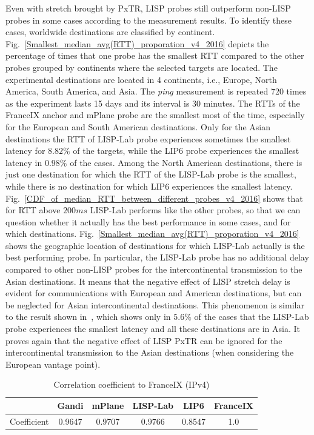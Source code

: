 Even with stretch brought by PxTR, LISP probes still outperform non-LISP probes in some cases according to the measurement results. To identify these cases, worldwide destinations are classified by continent.
Fig.~\ref{Smallest_median_avg(RTT)_proporation_v4_2016} depicts the percentage of times that one probe has the smallest RTT compared to the other probes grouped by continents where the selected targets are located.
The experimental destinations are located in 4 continents, i.e., Europe, North America, South America, and Asia. The \emph{ping} measurement is repeated 720 times as the experiment lasts 15 days and its interval is 30 minutes. The RTTs of the FranceIX anchor and mPlane probe are the smallest most of the time, especially for the European and South American destinations. Only for the Asian destinations the RTT of LISP-Lab probe experiences sometimes the smallest latency for $8.82\%$ of the targets, while the LIP6 probe experiences the smallest latency in $0.98\%$ of the cases. Among the North American destinations, there is just one destination for which the RTT of the LISP-Lab probe is the smallest, while there is no destination for which LIP6 experiences the smallest latency. Fig.~\ref{CDF_of_median_RTT_between_different_probes_v4_2016} shows that for RTT above $200ms$ LISP-Lab performs like the other probes, so that we can question whether it actually has the best performance in some cases, and for which destinations. Fig.~\ref{Smallest_median_avg(RTT)_proporation_v4_2016} shows the geographic location of destinations for which LISP-Lab actually is the best performing probe. In particular, the LISP-Lab probe has no additional delay compared to other non-LISP probes for the intercontinental transmission to the Asian destinations. It means that the negative effect of LISP stretch delay is evident for communications with European and American destinations, but can be neglected for Asian intercontinental destinations. This phenomenon is similar to the result shown in~\cite{li2016performance}, which shows only in $5.6\%$ of the cases that the LISP-Lab probe experiences the smallest latency and all these destinations are in Asia. It proves again that the negative effect of LISP PxTR can be ignored for the intercontinental transmission to the Asian destinations (when considering the European vantage point).

 \begin{table}[!tb]
 	\centering
 	\caption{Correlation coefficient to FranceIX (IPv4)}
 	\label{correlation_v4_2016}{
 		\begin{tabular}{@{}c|c|c|c|c|c@{}}
 			\hline\hline
 			 & Gandi  & mPlane  & LISP-Lab  & LIP6 &  FranceIX \\ \hline
 			Coefficient &  0.9647 & 0.9707 & 0.9766 & 0.8547 & 1.0     	\\  \hline\hline                 
 		\end{tabular}
 	}
 \end{table}

